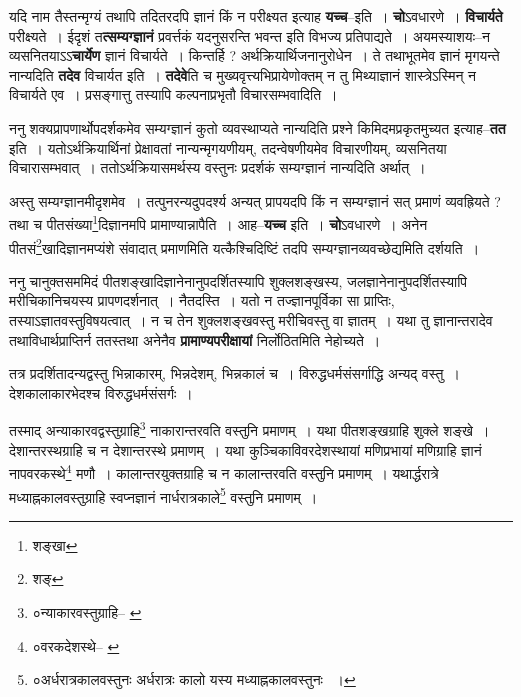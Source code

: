 \documentclass[article,12pt,a4paper]{memoir}
\begin{document}
	  \pstart यदि नाम तैस्तन्मृग्यं तथापि तदितरदपि ज्ञानं किं न परीक्ष्यत इत्याह \textbf{यच्च}--इति । \textbf{चो}ऽवधारणे । \textbf{विचार्यते} परीक्ष्यते । ईदृशं त\textbf{त्सम्यग्ज्ञानं} प्रवर्त्तकं यदनुसरन्ति भवन्त इति विभज्य प्रतिपाद्यते । अयमस्याशयः--न व्यसनितयाऽऽ\textbf{चार्येण} ज्ञानं विचार्यते । किन्तर्हि ? अर्थक्रियार्थिजनानुरोधेन । ते तथाभूतमेव ज्ञानं मृगयन्ते नान्यदिति \textbf{तदेव} विचार्यत इति । \textbf{तदेवे}ति च मुख्यवृत्त्यभिप्रायेणोक्तम् न तु मिथ्याज्ञानं शास्त्रेऽस्मिन् न विचार्यते एव । प्रसङ्गात्तु तस्यापि कल्पनाप्रभृतौ विचारसम्भवादिति ।
	\pend
      

	  \pstart ननु शक्यप्रापणार्थोपदर्शकमेव सम्यग्ज्ञानं कुतो व्यवस्थाप्यते नान्यदिति प्रश्ने किमिदमप्रकृतमुच्यत इत्याह--\textbf{तत} इति । यतोऽर्थक्रियार्थिनां प्रेक्षावतां नान्यन्मृगयणीयम्, तदन्वेषणीयमेव विचारणीयम्, व्यसनितया विचारासम्भवात् । ततोऽर्थक्रियासमर्थस्य वस्तुनः प्रदर्शकं सम्यग्ज्ञानं नान्यदिति अर्थात् ।
	\pend
      

	  \pstart अस्तु सम्यग्ज्ञानमीदृशमेव । तत्पुनरन्यदुपदर्श्य अन्यत् प्रापयदपि किं न सम्यग्ज्ञानं सत् प्रमाणं व्यवह्रियते ? तथा च पीतसंख्या\footnote{शङ्खा}दिज्ञानमपि प्रामाण्यान्नापैति । आह--\textbf{यच्च} इति । \textbf{चो}ऽवधारणे । अनेन पीतसं\footnote{शङ्}खादिज्ञानमप्यंशे संवादात् प्रमाणमिति यत्कैश्चिदिष्टिं तदपि सम्यग्ज्ञानव्यवच्छेद्यमिति दर्शयति ।
	\pend
      

	  \pstart ननु चानुक्तसममिदं पीतशङ्खादिज्ञानेनानुपदर्शितस्यापि शुक्लशङ्खस्य, जलज्ञानेनानुपदर्शितस्यापि मरीचिकानिचयस्य प्रापणदर्शनात् । नैतदस्ति । यतो न तज्ज्ञानपूर्विका सा प्राप्तिः, तस्याऽज्ञातवस्तुविषयत्वात् । न च तेन शुक्लशङ्खवस्तु मरीचिवस्तु वा ज्ञातम् । यथा तु ज्ञानान्तरादेव तथाविधार्थप्राप्तिर्न ततस्तथा अनेनैव \textbf{प्रामाण्यपरीक्षायां} निर्लोठितमिति नेहोच्यते ।
	\pend
      \leavevmode{}
	  \bigskip
	  \begingroup
	

	  \pstart तत्र प्रदर्शितादन्यद्वस्तु भिन्नाकारम्, भिन्नदेशम्, भिन्नकालं च । विरुद्धधर्मसंसर्गाद्धि अन्यद् वस्तु । देशकालाकारभेदश्च विरुद्धधर्मसंसर्गः ।
	\pend
       

	  \pstart तस्माद् अन्याकारवद्वस्तुग्राहि\footnote{०न्याकारवस्तुग्राहि--\cite{dp-msB} \cite{dp-msC} \cite{dp-msD}} नाकारान्तरवति वस्तुनि प्रमाणम् । यथा पीतशङ्खग्राहि शुक्ले शङ्खे । देशान्तरस्थग्राहि च न देशान्तरस्थे प्रमाणम् । यथा कुञ्चिकाविवरदेशस्थायां मणिप्रभायां मणिग्राहि ज्ञानं नापवरकस्थे\footnote{०वरकदेशस्थे--\cite{dp-msA} \cite{dp-msB} \cite{dp-msC} \cite{dp-msD} \cite{dp-edP} \cite{dp-edE} \cite{dp-edH} \cite{dp-edN}} मणौ । कालान्तरयुक्तग्राहि च न कालान्तरवति वस्तुनि प्रमाणम् । यथार्द्धरात्रे मध्याह्नकालवस्तुग्राहि स्वप्नज्ञानं नार्धरात्रकाले\footnote{०अर्धरात्रकालवस्तुनः \cite{dp-edN} अर्धरात्रः कालो यस्य मध्याह्नकालवस्तुनः \cite{dp-msD-n} ।} वस्तुनि प्रमाणम् ।
	\pend
      
\end{document}
